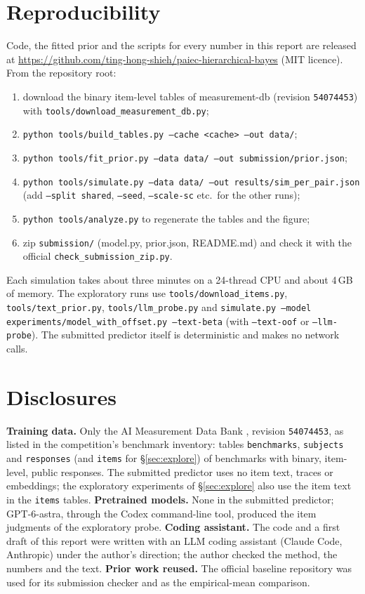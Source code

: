 \documentclass{article}
\begin{document}
\section{Reproducibility}

Code, the fitted prior and the scripts for every number in this report are released at \url{https://github.com/ting-hong-shieh/paiec-hierarchical-bayes} (MIT licence). From the repository root:
\begin{enumerate}
  \item download the binary item-level tables of measurement-db (revision \texttt{54074453}) with \texttt{tools/download\_measurement\_db.py};
  \item \texttt{python tools/build\_tables.py --cache <cache> --out data/};
  \item \texttt{python tools/fit\_prior.py --data data/ --out submission/prior.json};
  \item \texttt{python tools/simulate.py --data data/ --out results/sim\_per\_pair.json} (add \texttt{--split shared}, \texttt{--seed}, \texttt{--scale-sc} etc.\ for the other runs);
  \item \texttt{python tools/analyze.py} to regenerate the tables and the figure;
  \item zip \texttt{submission/} (model.py, prior.json, README.md) and check it with the official \texttt{check\_submission\_zip.py}.
\end{enumerate}
Each simulation takes about three minutes on a 24-thread CPU and about 4\,GB of memory. The exploratory runs use \texttt{tools/download\_items.py}, \texttt{tools/text\_prior.py}, \texttt{tools/llm\_probe.py} and \texttt{simulate.py --model experiments/model\_with\_offset.py --text-beta} (with \texttt{--text-oof} or \texttt{--llm-probe}). The submitted predictor itself is deterministic and makes no network calls.

\section*{Disclosures}

\textbf{Training data.} Only the AI Measurement Data Bank \citep{measurementdb2026}, revision \texttt{54074453}, as listed in the competition's benchmark inventory: tables \texttt{benchmarks}, \texttt{subjects} and \texttt{responses} (and \texttt{items} for \S\ref{sec:explore}) of benchmarks with binary, item-level, public responses. The submitted predictor uses no item text, traces or embeddings; the exploratory experiments of \S\ref{sec:explore} also use the item text in the \texttt{items} tables. \textbf{Pretrained models.} None in the submitted predictor; GPT-6-astra, through the Codex command-line tool, produced the item judgments of the exploratory probe. \textbf{Coding assistant.} The code and a first draft of this report were written with an LLM coding assistant (Claude Code, Anthropic) under the author's direction; the author checked the method, the numbers and the text. \textbf{Prior work reused.} The official baseline repository \citep{paiec_baselines_2026} was used for its submission checker and as the empirical-mean comparison.



\end{document}
